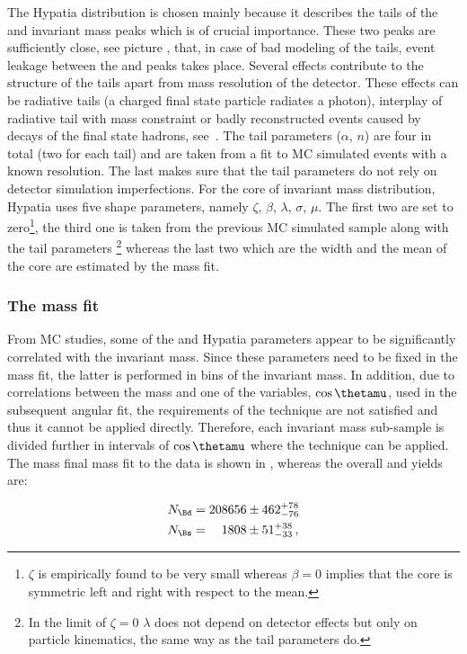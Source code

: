 The Hypatia distribution is chosen mainly because it describes the tails of the \Bs and \Bd invariant mass peaks which is
of crucial importance. These two peaks are sufficiently close,
see picture , that, in case of bad modeling of the tails, event leakage between the \Bs and \Bd peaks
takes place. Several effects contribute to the structure of the tails apart from mass resolution of the detector. These effects
can be radiative tails (a charged final state particle radiates a photon), interplay of radiative tail with \jpsi mass constraint
or badly reconstructed events caused by decays of the final state hadrons, see~\cite{Santos:2013gra}. The tail parameters ($\alpha$, $n$)
are four in total (two for each tail) and are taken from a fit to MC simulated events with a known resolution. The last makes sure that
the tail parameters do not rely on detector simulation imperfections.
For the core of invariant mass distribution, Hypatia uses five shape parameters, namely $\zeta$, $\beta$, $\lambda$, $\sigma$, $\mu$.
The first two are set to zero\footnote{$\zeta$ is empirically found to be very small whereas
$\beta = 0$ implies that the core is symmetric left and right with respect to the mean.}, the third one is taken from the previous
MC simulated sample along with the tail parameters \footnote{In the limit of $\zeta = 0$ $\lambda$ does not depend on detector
effects but only on particle kinematics, the same way as the tail parameters do.} whereas the last two which are the width and
the mean of the core are estimated by the mass fit.

\subsubsection{The mass fit}
From MC studies, some of the \Bs and \Bd Hypatia parameters appear to be significantly correlated with the \mkpi invariant mass.
Since these parameters need to be fixed in the mass fit, the latter is performed in bins of the
\mkpi invariant mass. In addition, due to correlations between the mass and one of the variables, $\cos\thetamu$, used in the
subsequent angular fit, the requirements of the \sPlot technique are not satisfied and thus it cannot be applied directly.
Therefore, each \mkpi invariant mass sub-sample is divided further in intervals of $\cos\thetamu$ where the \sPlot technique
can be applied.  The mass final mass fit to the data is shown in , whereas the overall \Bs and \Bd yields are:

\begin{align}
  \centering
  N_{\Bd} &= 208656  \pm  462 ^{+ 78	}_{- 76}\\
  N_{\Bs} &= \phantom{00}1808  \pm   51 ^{+ 38	}_{- 33} \, ,
  \label{signal_yields}
\end{align}


